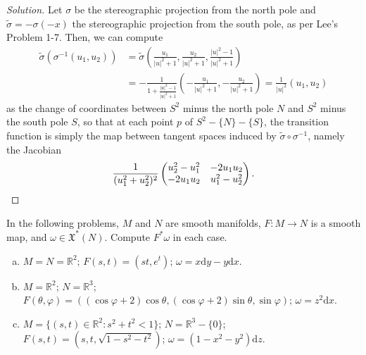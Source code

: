 \documentclass[10pt]{article}
\newcommand{\dd}{\mathrm{d}}
\providecommand{\RR}{\mathbb R}
\providecommand{\ii}{\item}
\providecommand{\inv}{^{-1}}
\newenvironment{soln}{\begin{proof}[Solution]}{\end{proof}}
\providecommand{\abs}[1]{\left\lvert #1\right\rvert}
\begin{document}
\begin{soln}
    Let $\sigma$ be the stereographic projection from the north pole
    and $\tilde\sigma = -\sigma(-x)$ the stereographic projection
    from the south pole, as per Lee's Problem 1-7.
    Then, we can compute
    \begin{align*}
        \tilde\sigma(\sigma\inv(u_1,u_2))
	&= \tilde\sigma\left(\frac{u_1}{\abs u^2+1},
	\frac{u_2}{\abs u^2+1},\frac{\abs u^2-1}{\abs u^2+1}\right)\\
	&= -\frac 1{1 + \frac{\abs u^2-1}{\abs u^2+1}}
	\left(-\frac{u_1}{\abs u^2+1},-\frac{u_2}{\abs u^2+1}\right)
	= \frac 1{\abs u^2}(u_1,u_2)
    \end{align*}
    as the change of coordinates between $S^2$ minus the north pole $N$
    and $S^2$ minus the south pole $S$,
    so that at each point $p$ of $S^2 - \{N\} - \{S\}$,
    the transition function is simply the map between tangent spaces
    induced by $\tilde\sigma\circ\sigma\inv$, namely the Jacobian
    \begin{equation*}
	\frac 1{(u_1^2+u_2^2)^2}
        \begin{pmatrix}
	    u_2^2-u_1^2&-2u_1u_2\\-2u_1u_2&u_1^2-u_2^2
        \end{pmatrix}.\qedhere
    \end{equation*}
\end{soln}

\begin{problem}
    [11-7]
    In the following problems, $M$ and $N$ are smooth manifolds,
    $F\colon M\to N$ is a smooth map, and $\omega\in\mathfrak X^*(N)$.
    Compute $F^*\omega$ in each case.
    \begin{enumerate}[(a)]
        \ii $M = N = \RR^2$; $F(s,t) = (st,e^t)$;
	$\omega = x\dd y - y\dd x$.
	\ii $M = \RR^2$; $N = \RR^3$;
	$F(\theta,\varphi) = ((\cos\varphi+2)\cos\theta,
	(\cos\varphi+2)\sin\theta, \sin\varphi)$;
	$\omega = z^2\dd x$.
	\ii $M = \{(s,t)\in\RR^2 : s^2 + t^2 < 1\}$;
	$N = \RR^3 - \{0\}$;
	$F(s,t) = (s,t,\sqrt{1-s^2-t^2})$;
	$\omega = (1-x^2-y^2)\dd z$.
    \end{enumerate}
\end{problem}
\end{document}
